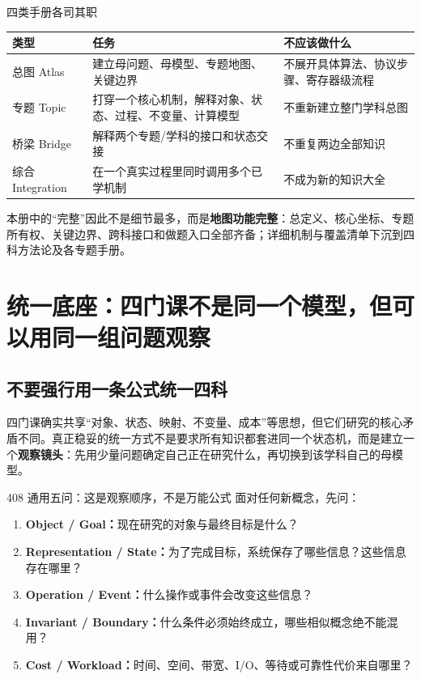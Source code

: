 \documentclass[11pt,a4paper,openany]{ctexbook}
\newcommand{\key}[1]{\textbf{\color{deep}#1}}
\begin{document}
\begin{boundarybox}{四类手册各司其职}
\begin{longtable}{L{2.6cm}L{4.0cm}L{\dimexpr\linewidth-7.85cm\relax}}
\toprule
\textbf{类型} & \textbf{任务} & \textbf{不应该做什么}\\
\midrule
总图 Atlas & 建立母问题、母模型、专题地图、关键边界 & 不展开具体算法、协议步骤、寄存器级流程\\
专题 Topic & 打穿一个核心机制，解释对象、状态、过程、不变量、计算模型 & 不重新建立整门学科总图\\
桥梁 Bridge & 解释两个专题/学科的接口和状态交接 & 不重复两边全部知识\\
综合 Integration & 在一个真实过程里同时调用多个已学机制 & 不成为新的知识大全\\
\bottomrule
\end{longtable}
\end{boundarybox}

本册中的“完整”因此不是细节最多，而是\key{地图功能完整}：总定义、核心坐标、专题所有权、关键边界、跨科接口和做题入口全部齐备；详细机制与覆盖清单下沉到四科方法论及各专题手册。

\tableofcontents
\mainmatter

\chapter{统一底座：四门课不是同一个模型，但可以用同一组问题观察}

\section{不要强行用一条公式统一四科}
四门课确实共享“对象、状态、映射、不变量、成本”等思想，但它们研究的核心矛盾不同。真正稳妥的统一方式不是要求所有知识都套进同一个状态机，而是建立一个\key{观察镜头}：先用少量问题确定自己正在研究什么，再切换到该学科自己的母模型。

\begin{corebox}{408 通用五问：这是观察顺序，不是万能公式}
面对任何新概念，先问：
\begin{enumerate}
  \item \key{Object / Goal：}现在研究的对象与最终目标是什么？
  \item \key{Representation / State：}为了完成目标，系统保存了哪些信息？这些信息存在哪里？
  \item \key{Operation / Event：}什么操作或事件会改变这些信息？
  \item \key{Invariant / Boundary：}什么条件必须始终成立，哪些相似概念绝不能混用？
  \item \key{Cost / Workload：}时间、空间、带宽、I/O、等待或可靠性代价来自哪里？
\end{enumerate}
\end{corebox}
\end{document}
